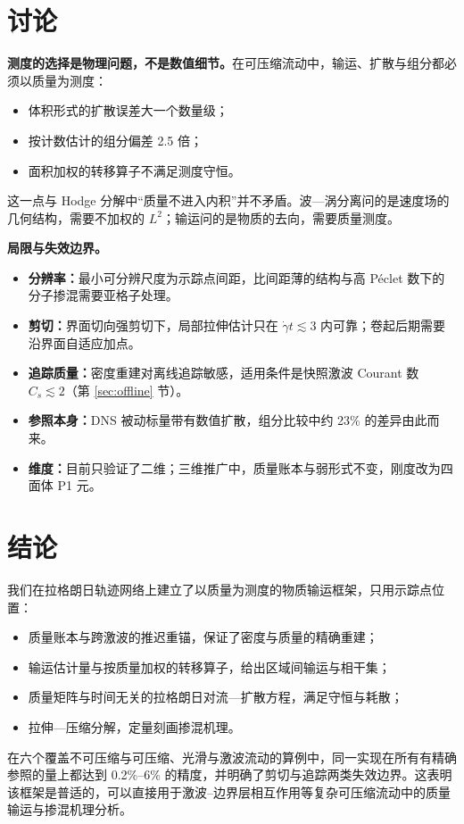 \documentclass[10.5pt,a4paper]{article}
\begin{document}
\section{讨论}
\textbf{测度的选择是物理问题，不是数值细节。}在可压缩流动中，输运、扩散与组分都必须以质量为测度：
\begin{itemize}
\item 体积形式的扩散误差大一个数量级；
\item 按计数估计的组分偏差 2.5 倍；
\item 面积加权的转移算子不满足测度守恒。
\end{itemize}
这一点与 Hodge 分解中“质量不进入内积”并不矛盾。波—涡分离问的是速度场的几何结构，需要不加权的 $L^2$；输运问的是物质的去向，需要质量测度。

\textbf{局限与失效边界。}
\begin{itemize}
\item \textbf{分辨率：}最小可分辨尺度为示踪点间距，比间距薄的结构与高 Péclet 数下的分子掺混需要亚格子处理。
\item \textbf{剪切：}界面切向强剪切下，局部拉伸估计只在 $\dot\gamma t\lesssim3$ 内可靠；卷起后期需要沿界面自适应加点。
\item \textbf{追踪质量：}密度重建对离线追踪敏感，适用条件是快照激波 Courant 数 $C_s\lesssim2$（第 \ref{sec:offline} 节）。
\item \textbf{参照本身：}DNS 被动标量带有数值扩散，组分比较中约 23\% 的差异由此而来。
\item \textbf{维度：}目前只验证了二维；三维推广中，质量账本与弱形式不变，刚度改为四面体 P1 元。
\end{itemize}

\section{结论}
我们在拉格朗日轨迹网络上建立了以质量为测度的物质输运框架，只用示踪点位置：
\begin{itemize}
\item 质量账本与跨激波的推迟重锚，保证了密度与质量的精确重建；
\item 输运估计量与按质量加权的转移算子，给出区域间输运与相干集；
\item 质量矩阵与时间无关的拉格朗日对流—扩散方程，满足守恒与耗散；
\item 拉伸—压缩分解，定量刻画掺混机理。
\end{itemize}
在六个覆盖不可压缩与可压缩、光滑与激波流动的算例中，同一实现在所有有精确参照的量上都达到 0.2\%–6\% 的精度，并明确了剪切与追踪两类失效边界。这表明该框架是普适的，可以直接用于激波–边界层相互作用等复杂可压缩流动中的质量输运与掺混机理分析。
\end{document}
